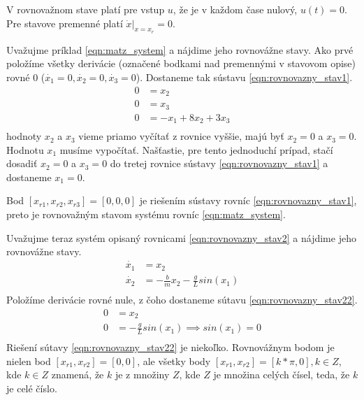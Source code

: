\documentclass[../main.tex]{subfiles}
\begin{document}
V rovnovažnom stave platí pre vstup $u$, že je v každom čase nulový, $u(t)=0$. Pre stavove premenné platí $\dot{x}|_{x = x_r} = 0$.

Uvažujme príklad \ref{eqn:matz_system} a nájdime jeho rovnovážne stavy. Ako prvé položíme všetky derivácie (označené bodkami nad premennými v stavovom opise) rovné 0 ($\dot{x_1} = 0,\dot{x_2} = 0,\dot{x_3} = 0$). Dostaneme tak sústavu \ref{eqn:rovnovazny_stav1}.
\begin{equation}
	\begin{aligned}
        0 &= x_2 \\
		0 &= x_3 \\
		0 &= -x_1 + 8x_2 + 3x_3\\
	\end{aligned}
	\label{eqn:rovnovazny_stav1}
\end{equation}
hodnoty $x_2$ a $x_3$ vieme priamo vyčítať z rovnice vyššie, majú byť $x_2=0$ a $x_3=0$. Hodnotu $x_1$ musíme vypočítať. Našťastie, pre tento jednoduchí prípad, stačí dosadiť $x_2=0$ a $x_3=0$ do tretej rovnice sústavy \ref{eqn:rovnovazny_stav1} a dostaneme $x_1=0$.

Bod $[x_{r1},x_{r2},x_{r3}] = [0,0,0]$ je riešením sústavy rovníc \ref{eqn:rovnovazny_stav1}, preto je rovnovažným stavom systému rovníc \ref{eqn:matz_system}.

Uvažujme teraz systém opisaný rovnicami \ref{eqn:rovnovazny_stav2} a nájdime jeho rovnovážne stavy.
\begin{equation}
	\begin{aligned}
        \dot{x_1} &= x_2 \\
		\dot{x_2} &= -\frac{b}{m}x_2-\frac{g}{L}sin(x_1) \\
	\end{aligned}
	\label{eqn:rovnovazny_stav2}
\end{equation}
Položíme derivácie rovné nule, z čoho dostaneme sútavu \ref{eqn:rovnovazny_stav22}.
\begin{equation}
	\begin{aligned}
        0 &= x_2 \\
		0 &= -\frac{g}{L}sin(x_1) \implies sin(x_1) = 0\\
	\end{aligned}
	\label{eqn:rovnovazny_stav22}
\end{equation}
Riešení sútavy \ref{eqn:rovnovazny_stav22} je niekoľko. Rovnovážnym bodom je nielen bod $[x_{r1},x_{r2}] = [0,0]$, ale všetky body $[x_{r1},x_{r2}] = [k*\pi,0],k \in Z$, kde $k \in Z$ znamená, že $k$ je z množiny $Z$, kde $Z$ je množina celých čísel, teda, že $k$ je celé číslo.
	
\end{document}
